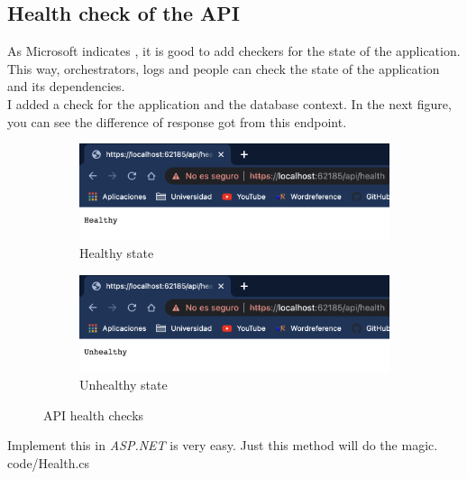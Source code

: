     \subsection{Health check of the API}
        As Microsoft indicates \cite{Health}, it is good to add checkers for the state of the application. This way, orchestrators, logs and people can check the state of the application and its dependencies. \\
        I added a check for the application and the database context. In the next figure, you can see the difference of response got from this endpoint. \\
        
        \begin{figure}[H]
            \centering
            \begin{subfigure}[T]{0.49\textwidth}
                \centering
                \includegraphics[width=\textwidth]{assets/healthy.png}
                \caption{Healthy state}
                \label{fig:impl_healthy}
            \end{subfigure}
            \hfill
            \begin{subfigure}[T]{0.49\textwidth}
                \centering
                \includegraphics[width=\textwidth]{assets/unhealthy.png}
                \caption{Unhealthy state}
                \label{fig:impl_unhealthy}
            \end{subfigure}
            \caption{API health checks}
            \label{fig:impl_health}
        \end{figure}

        Implement this in \textit{ASP.NET} is very easy. Just this method will do the magic. \\
        
        {code/Health.cs}

